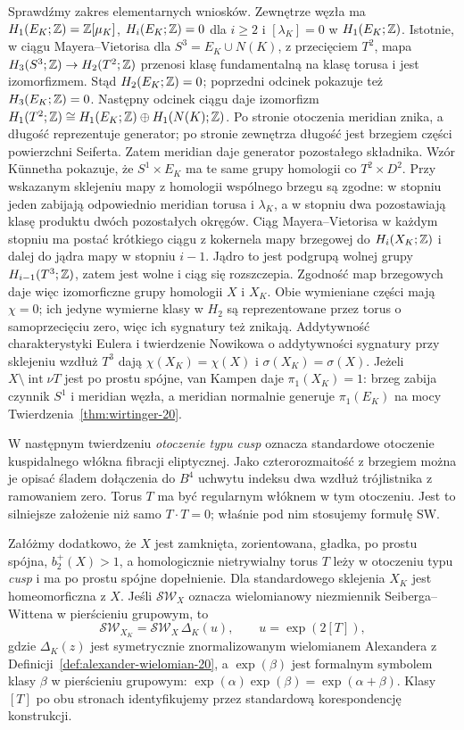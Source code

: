 Sprawdźmy zakres elementarnych wniosków.
Zewnętrze węzła ma $H_1(E_K;\mathbb{Z})=\mathbb{Z}[\mu_K]$,
$H_i(E_K;\mathbb{Z})=0$ dla $i\geq2$ i
$[\lambda_K]=0$ w $H_1(E_K;\mathbb{Z})$.
Istotnie, w ciągu Mayera--Vietorisa dla
$S^3=E_K\cup N(K)$, z przecięciem $T^2$,
mapa $H_3(S^3;\mathbb{Z})\to H_2(T^2;\mathbb{Z})$ przenosi
klasę fundamentalną na klasę torusa i jest
izomorfizmem. Stąd $H_2(E_K;\mathbb{Z})=0$;
poprzedni odcinek pokazuje też $H_3(E_K;\mathbb{Z})=0$.
Następny odcinek ciągu daje izomorfizm
$H_1(T^2;\mathbb{Z})\cong H_1(E_K;\mathbb{Z})\oplus H_1(N(K);\mathbb{Z})$.
Po stronie otoczenia meridian znika, a długość
reprezentuje generator; po stronie zewnętrza
długość jest brzegiem części powierzchni Seiferta.
Zatem meridian daje generator pozostałego składnika.
Wzór Künnetha pokazuje, że $S^1\times E_K$
ma te same grupy homologii co $T^2\times D^2$.
Przy wskazanym sklejeniu mapy z homologii wspólnego
brzegu są zgodne: w stopniu jeden zabijają odpowiednio
meridian torusa i $\lambda_K$, a w stopniu dwa
pozostawiają klasę produktu dwóch pozostałych okręgów.
Ciąg Mayera--Vietorisa w każdym stopniu ma postać
krótkiego ciągu z kokernela mapy brzegowej do
$H_i(X_K;\mathbb{Z})$ i dalej do jądra mapy w stopniu $i-1$.
Jądro to jest podgrupą wolnej grupy
$H_{i-1}(T^3;\mathbb{Z})$, zatem jest wolne i ciąg się
rozszczepia. Zgodność map brzegowych daje więc
izomorficzne grupy homologii $X$ i $X_K$.
Obie wymieniane części mają $\chi=0$; ich jedyne
wymierne klasy w $H_2$ są reprezentowane przez
torus o samoprzecięciu zero, więc ich sygnatury
też znikają. Addytywność charakterystyki Eulera
i twierdzenie Nowikowa o addytywności sygnatury
przy sklejeniu wzdłuż $T^3$ dają $\chi(X_K)=\chi(X)$ i
$\sigma(X_K)=\sigma(X)$.
Jeżeli $X\setminus\operatorname{int}\nu T$ jest
po prostu spójne, van Kampen daje $\pi_1(X_K)=1$:
brzeg zabija czynnik $S^1$ i meridian węzła,
a meridian normalnie generuje $\pi_1(E_K)$
na mocy Twierdzenia~\ref{thm:wirtinger-20}.

W następnym twierdzeniu \emph{otoczenie typu cusp}
oznacza standardowe otoczenie kuspidalnego włókna
fibracji eliptycznej. Jako czterorozmaitość z brzegiem
można je opisać śladem dołączenia do $B^4$
uchwytu indeksu dwa wzdłuż trójlistnika z ramowaniem
zero. Torus $T$ ma być regularnym włóknem w tym
otoczeniu. Jest to silniejsze założenie niż samo
$T\cdot T=0$; właśnie pod nim stosujemy formułę SW.

\begin{twierdzenie}
\label{thm:fs-chirurgia-cztery}
Załóżmy dodatkowo, że $X$ jest zamknięta, zorientowana,
gładka, po prostu spójna, $b_2^+(X)>1$, a homologicznie
nietrywialny torus $T$ leży w otoczeniu typu \emph{cusp}
i ma po prostu spójne dopełnienie. Dla standardowego
sklejenia $X_K$ jest homeomorficzna z $X$.
Jeśli $\mathcal{SW}_X$ oznacza wielomianowy niezmiennik
Seiberga--Wittena w pierścieniu grupowym, to
\[
 \mathcal{SW}_{X_K}=\mathcal{SW}_X\,\Delta_K(u),
 \qquad u=\exp(2[T]),
\]
gdzie $\Delta_K(z)$ jest symetrycznie znormalizowanym
wielomianem Alexandera z Definicji~\ref{def:alexander-wielomian-20},
a $\exp(\beta)$ jest
formalnym symbolem klasy $\beta$ w pierścieniu
grupowym: $\exp(\alpha)\exp(\beta)=\exp(\alpha+\beta)$.
Klasy $[T]$ po obu stronach identyfikujemy przez
standardową korespondencję konstrukcji.
\end{twierdzenie}

